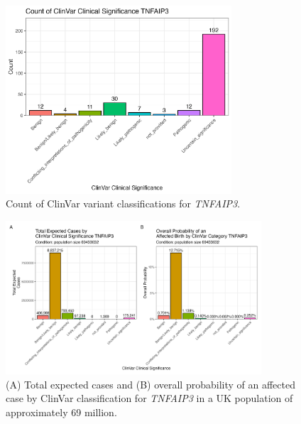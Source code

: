 \begin{figure}[ht]
  \centering
  \includegraphics[width=0.75\textwidth]{../images/tnfaip3_clinvar_count.png}
  \caption{Count of ClinVar variant classifications for \textit{TNFAIP3}.}
  \label{fig:tnfaip3_clinvar_count}
\end{figure}

\begin{figure}[ht]
  \centering
  \includegraphics[width=0.85\textwidth]{../images/tnfaip3_combined_bar_charts.png}
  \caption{(A) Total expected cases and (B) overall probability of an affected case by ClinVar classification for \textit{TNFAIP3} in a UK population of approximately 69 million.}
  \label{fig:tnfaip3_combined_bar_charts}
\end{figure}

